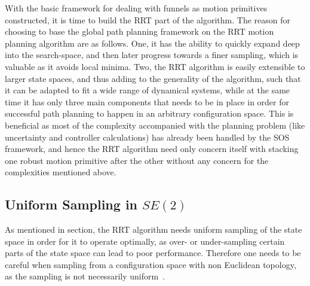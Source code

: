 With the basic framework for dealing with funnels as motion primitives
constructed, it is time to build the \ac{RRT} part of the \rrtfunnel{}
algorithm. The reason for choosing to base the global path planning framework on
the \ac{RRT} motion planning algorithm are as follows. One, it has the ability
to quickly expand deep into the search-space, and then later progress towards a
finer sampling, which is valuable as it avoids local minima. Two, the \ac{RRT}
algorithm is easily extensible to larger state spaces, and thus adding to the
generality of the \rrtfunnel{} algorithm, such that it can be adapted to fit a
wide range of dynamical systems, while at the same time it has only three main
components that needs to be in place in order for successful path planning to
happen in an arbitrary configuration space. This is beneficial as most of the
complexity accompanied with the planning problem (like uncertainty and
controller calculations) has already been handled by the \ac{SOS} framework, and
hence the \ac{RRT} algorithm need only concern itself with stacking one robust
motion primitive after the other without any concern for the complexities
mentioned above.

\subsection{Uniform Sampling in \(SE(2)\)}

As mentioned in  section, the \ac{RRT}
algorithm needs uniform sampling of the state space in order for it to operate
optimally, as over- or under-sampling certain parts of the state space can lead
to poor performance. Therefore one needs to be careful when sampling from a
configuration space with non Euclidean topology, as the sampling is not
necessarily uniform~\cite{kuffnerEffectiveSamplingDistance2004}.

